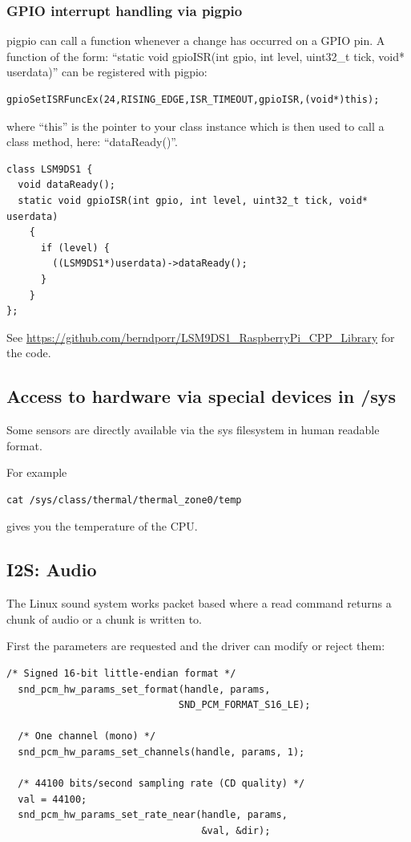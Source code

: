 \documentclass[12pt]{report}
\begin{document}
\subsubsection{GPIO interrupt handling via pigpio}
pigpio can call a function whenever a change has occurred on a GPIO pin.
A function of the form:
``static void gpioISR(int gpio, int level, uint32\_t tick, void* userdata)''
can be registered with pigpio:
\begin{verbatim}
gpioSetISRFuncEx(24,RISING_EDGE,ISR_TIMEOUT,gpioISR,(void*)this);
\end{verbatim}
where ``this'' is the pointer to your class instance which is then used
to call a class method, here: ``dataReady()''.
\begin{verbatim}
class LSM9DS1 {
  void dataReady();
  static void gpioISR(int gpio, int level, uint32_t tick, void* userdata)
    {
      if (level) {
        ((LSM9DS1*)userdata)->dataReady();
      }
    }
};
\end{verbatim}
See \url{https://github.com/berndporr/LSM9DS1_RaspberryPi_CPP_Library} for the code.

\subsection{Access to hardware via special devices in /sys}
Some sensors are directly available via the sys filesystem in human readable format.

For example
\begin{verbatim}
cat /sys/class/thermal/thermal_zone0/temp
\end{verbatim}
gives you the temperature of the CPU.




\subsection{I2S: Audio}
The Linux sound system works packet based where a read command
returns a chunk of audio or a chunk is written to.

First the parameters are requested and the driver can modify or
reject them:
\begin{verbatim}
/* Signed 16-bit little-endian format */
  snd_pcm_hw_params_set_format(handle, params,
                              SND_PCM_FORMAT_S16_LE);

  /* One channel (mono) */
  snd_pcm_hw_params_set_channels(handle, params, 1);

  /* 44100 bits/second sampling rate (CD quality) */
  val = 44100;
  snd_pcm_hw_params_set_rate_near(handle, params,
                                  &val, &dir);
\end{verbatim}
\end{document}
